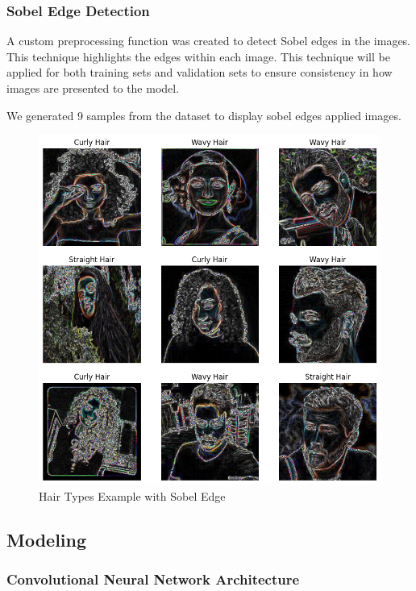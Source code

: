 \subsubsection{Sobel Edge Detection}

A custom preprocessing function was created to detect Sobel edges in the images. This technique highlights the edges within each image. This technique will be applied for both training sets and validation sets to ensure consistency in how images are presented to the model.

We generated 9 samples from the dataset to display sobel edges applied images.

\begin{figure}[H]
  \includegraphics[width=\linewidth]{figures/sobel_edge_images.png}
  \caption{Hair Types Example with Sobel Edge}
  \label{fig:sobel_edge_hairtypes}
\end{figure}

\subsection{Modeling}

\subsubsection{Convolutional Neural Network Architecture}

